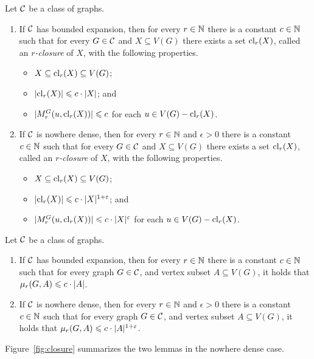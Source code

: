 \begin{lemma}\label{lem:closure}
Let $\mathcal{C}$ be a class of graphs. 
\begin{enumerate}
\item If $\mathcal{C}$ has bounded expansion, then for every $r\in \mathbb{N}$ there is a constant $c\in \mathbb{N}$ such that for
every $G\in \mathcal{C}$ and $X\subseteq V(G)$ there exists a set $\mathrm{cl}_r(X)$, called an {\em{$r$-closure}} of $X$, with the following properties. 
\begin{itemize}
  \item $X\subseteq \mathrm{cl}_r(X)\subseteq V(G)$;
  \item $|\mathrm{cl}_r(X)|\leqslant c\cdot |X|$; and
  \item $|M_r^G(u,\mathrm{cl}_r(X))|\leqslant c$ for each $u\in V(G)- \mathrm{cl}_r(X)$.
\end{itemize}
\item If $\mathcal{C}$ is nowhere dense, then for every $r\in\mathbb{N}$ and $\epsilon>0$ there is a 
constant $c\in\mathbb{N}$ such that for every $G\in \mathcal{C}$ and $X\subseteq V(G)$ there exists a set 
$\mathrm{cl}_r(X)$,  called an {\em{$r$-closure}} of $X$, 
with the following properties. 
\begin{itemize}
  \item $X\subseteq \mathrm{cl}_r(X)\subseteq V(G)$;
  \item $|\mathrm{cl}_r(X)|\leqslant c\cdot |X|^{1+\varepsilon}$; and
  \item $|M_r^G(u,\mathrm{cl}_r(X))|\leqslant c\cdot |X|^{\varepsilon}$ for each $u\in V(G)- \mathrm{cl}_r(X)$.
\end{itemize}
\end{enumerate}
\end{lemma}

\begin{lemma}\label{lem:projection-complexity}
Let $\mathcal{C}$ be a class of graphs. 
\begin{enumerate}
\item If $\mathcal{C}$ has bounded expansion, then for every $r\in \mathbb{N}$ there is 
  a constant $c\in\mathbb{N}$ such that for every graph $G\in \mathcal{C}$, and vertex subset $A\subseteq V(G)$, 
  it holds that $\mu_r(G,A)\leqslant c\cdot |A|$.
  \item If $\mathcal{C}$ is nowhere dense, then for every $r\in \mathbb{N}$ and $\epsilon>0$ there is 
  a constant $c\in \mathbb{N}$ such that for every graph $G\in \mathcal{C}$, and vertex subset $A\subseteq V(G)$, 
  it holds that $\mu_r(G,A)\leqslant c\cdot |A|^{1+\varepsilon}$.
\end{enumerate}
\end{lemma}
Figure~\ref{fig:closure} summarizes the two lemmas 
in the nowhere dense case.

